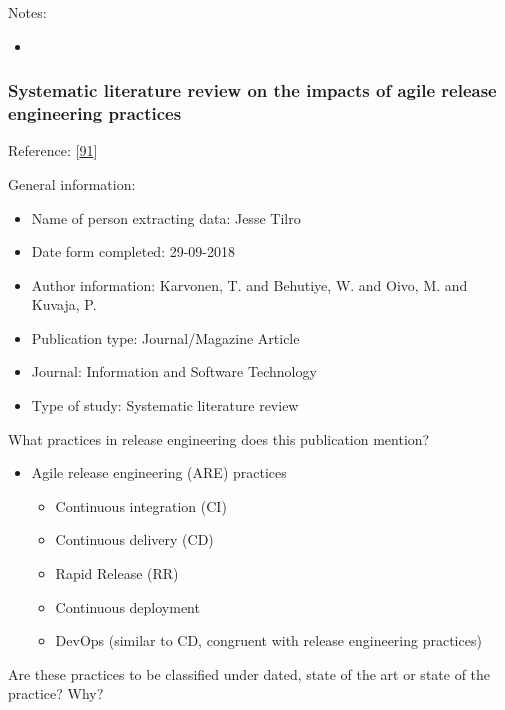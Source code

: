 \documentclass[]{book}
\providecommand{\tightlist}{%
  \setlength{\itemsep}{0pt}\setlength{\parskip}{0pt}}
\begin{document}
Notes:

\begin{itemize}
\item
\end{itemize}

\subsubsection{Systematic literature review on the impacts of agile
release engineering
practices}\label{systematic-literature-review-on-the-impacts-of-agile-release-engineering-practices}

Reference: {[}\protect\hyperlink{ref-karvonen2017a}{91}{]}

General information:

\begin{itemize}
\tightlist
\item
  Name of person extracting data: Jesse Tilro
\item
  Date form completed: 29-09-2018
\item
  Author information: Karvonen, T. and Behutiye, W. and Oivo, M. and
  Kuvaja, P.
\item
  Publication type: Journal/Magazine Article
\item
  Journal: Information and Software Technology
\item
  Type of study: Systematic literature review
\end{itemize}

What practices in release engineering does this publication mention?

\begin{itemize}
\tightlist
\item
  Agile release engineering (ARE) practices

  \begin{itemize}
  \tightlist
  \item
    Continuous integration (CI)
  \item
    Continuous delivery (CD)
  \item
    Rapid Release (RR)
  \item
    Continuous deployment
  \item
    DevOps (similar to CD, congruent with release engineering practices)
  \end{itemize}
\end{itemize}

Are these practices to be classified under dated, state of the art or
state of the practice? Why?
\end{document}
